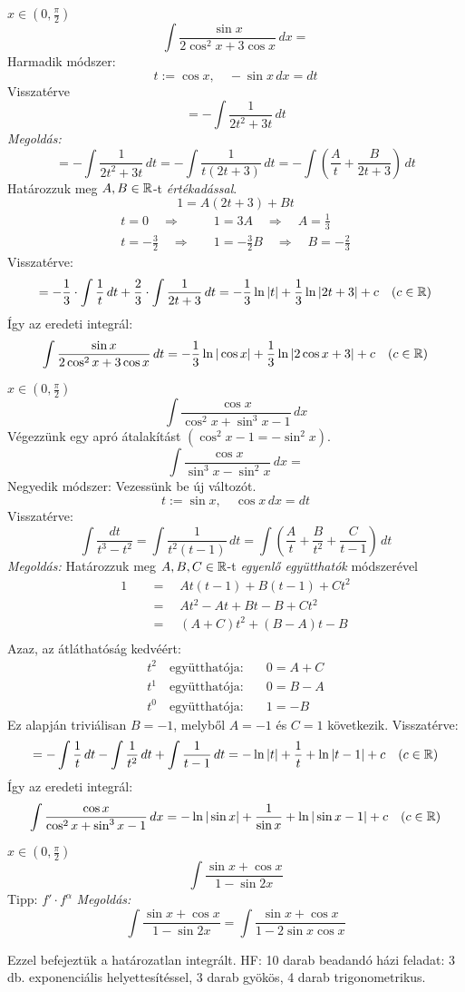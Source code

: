\documentclass[a4paper,11.5pt]{article}
\begin{document}
	\begin{exercise}$x\in\left(0,\frac{\pi}{2}\right)$
		\[ \int\frac{\sin x}{2\cos^2x+3\cos x}\,dx= \]
		Harmadik módszer:
		\[ t:=\cos x,\quad -\sin x\,dx=dt \]
		Visszatérve
		\[ =-\int\frac{1}{2t^2+3t}\,dt \]
		\textit{Megoldás:} 
		\[ =-\int\frac{1}{2t^2+3t}\,dt=-\int\frac{1}{t(2t+3)}\,dt=-\int\left(\frac{A}{t}+\frac{B}{2t+3}\right)\,dt \]
		Határozzuk meg $A,B\in\mathbb{R}$-t \textit{értékadással}.
		\[ 1=A(2t+3)+Bt \]
		\vspace{-7mm}
		\begin{align*}
			t=0\quad \Rightarrow&\quad 1=3A\quad \Rightarrow\quad A=\frac{1}{3}\\
			t=-\frac{3}{2}\quad \Rightarrow&\quad 1=-\frac{3}{2}B\quad \Rightarrow \quad B=-\frac{2}{3}
		\end{align*}
		Visszatérve:
		\[ =-\frac{1}{3}\cdot\int\frac{1}{t}\,dt+\frac{2}{3}\cdot\int\frac{1}{2t+3}\,dt=-\frac{1}{3}\ln|t|+\frac{1}{3}\ln|2t+3|+c\quad (c\in\mathbb{R}) \]
		Így az eredeti integrál:
		\[ \int\frac{\sin x}{2\cos^2x+3\cos x}\,dt=-\frac{1}{3}\ln|\cos x|+\frac{1}{3}\ln|2\cos x+3|+c\quad (c\in\mathbb{R}) \]
	\end{exercise}
	\begin{exercise}$x\in\left(0,\frac{\pi}{2}\right)$
		\[ \int\frac{\cos x}{\cos^2x+\sin^3x-1}\,dx \]
		Végezzünk egy apró átalakítást $(\cos^2x-1 = -\sin^2x)$.
		\[ \int\frac{\cos x}{\sin^3x-\sin^2x}\,dx= \]
		Negyedik módszer: Vezessünk be új változót.
		\[ t:=\sin x,\quad \cos x\,dx=dt \]
		Visszatérve:
		\[ \int\frac{dt}{t^3-t^2}=\int\frac{1}{t^2(t-1)}\,dt=\int\left(\frac{A}{t}+\frac{B}{t^2}+\frac{C}{t-1}\right)\,dt \]
		\textit{Megoldás:} Határozzuk meg $A,B,C\in\mathbb{R}$-t \textit{egyenlő együtthatók} módszerével
		\begin{align*}
			1\quad &=\quad At(t-1)+B(t-1)+Ct^2\\
				   &=\quad At^2-At+Bt-B+Ct^2\\
				   &=\quad (A+C)t^2+(B-A)t-B\\
		\end{align*}
		Azaz, az átláthatóság kedvéért:
		\begin{align*}
			t^2 \quad \text{együtthatója:}&\quad  0=A+C\\
			t^1 \quad \text{együtthatója:}&\quad  0=B-A\\
			t^0 \quad \text{együtthatója:}&\quad  1=-B
		\end{align*}
		Ez alapján triviálisan $B=-1$, melyből $A=-1$ és $C=1$ következik. Visszatérve:
		\[ =-\int\frac{1}{t}\,dt-\int\frac{1}{t^2}\,dt+\int\frac{1}{t-1}\,dt=-\ln|t|+\frac{1}{t}+\ln|t-1|+c\quad (c\in\mathbb{R}) \]
		Így az eredeti integrál:
		\[ \int\frac{\cos x}{\cos^2x+\sin^3x-1}\,dx=-\ln|\sin x|+\frac{1}{\sin x}+\ln|\sin x-1|+c\quad (c\in\mathbb{R}) \]
	\end{exercise}
	\begin{exercise}$x\in\left(0,\frac{\pi}{2}\right)$
		\[ \int\frac{\sin x+\cos x}{1-\sin2x} \]
		Tipp: $f'\cdot f^\alpha$
		\textit{Megoldás:}
		\[ \int\frac{\sin x+\cos x}{1-\sin2x}=\int\frac{\sin x+\cos x}{1-2\sin x\cos x} \]
		
	\end{exercise}
	Ezzel befejeztük a határozatlan integrált. HF: 10 darab beadandó házi feladat: 3 db. exponenciális helyettesítéssel, 3 darab gyökös, 4 darab trigonometrikus.
\end{document}
